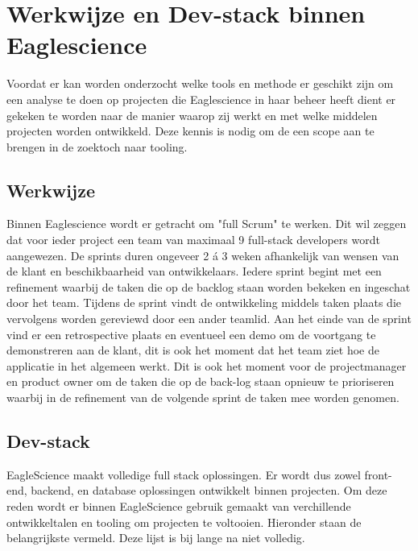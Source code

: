 \section{Werkwijze en Dev-stack binnen Eaglescience}\label{sec:werkwijze-en-dev-stack-binnen-eaglescience}
Voordat er kan worden onderzocht welke tools en methode er geschikt zijn om een analyse te doen op projecten die Eaglescience in haar beheer heeft dient er gekeken te worden naar de manier waarop zij werkt en met welke middelen projecten worden ontwikkeld. Deze kennis is nodig om de een scope aan te brengen in de zoektoch naar tooling.

\subsection{Werkwijze}\label{subsec:ESwerkwijze}
Binnen Eaglescience wordt er getracht om "full Scrum" te werken. Dit wil zeggen dat voor ieder project een team van maximaal 9 full-stack developers wordt aangewezen. De sprints duren ongeveer 2 á 3 weken afhankelijk van wensen van de klant en beschikbaarheid van ontwikkelaars. Iedere sprint begint met een refinement waarbij de taken die op de backlog staan worden bekeken en ingeschat door het team. Tijdens de sprint vindt de ontwikkeling middels taken plaats die vervolgens worden gereviewd door een ander teamlid. Aan het einde van de sprint vind er een retrospective plaats en eventueel een demo om de voortgang te demonstreren aan de klant, dit is ook het moment dat het team ziet hoe de applicatie in het algemeen werkt. Dit is ook het moment voor de projectmanager en product owner om de taken die op de back-log staan opnieuw te prioriseren waarbij in de refinement van de volgende sprint de taken mee worden genomen.

\subsection{Dev-stack}\label{subsec:ESdev-stack}
EagleScience maakt volledige full stack oplossingen. Er wordt dus zowel front-end, backend, en database oplossingen ontwikkelt binnen projecten. Om deze reden wordt er binnen EagleScience gebruik gemaakt van verchillende ontwikkeltalen en tooling om projecten te voltooien. Hieronder staan de belangrijkste vermeld. Deze lijst is bij lange na niet volledig.

